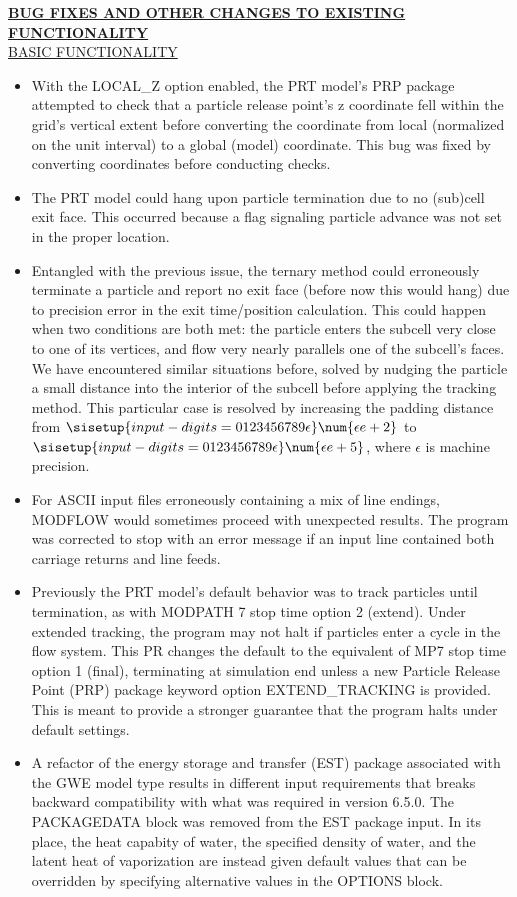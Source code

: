 	\textbf{\underline{BUG FIXES AND OTHER CHANGES TO EXISTING FUNCTIONALITY}} \\
	\underline{BASIC FUNCTIONALITY}
	\begin{itemize}
		\item With the LOCAL\_Z option enabled, the PRT model's PRP package attempted to check that a particle release point's z coordinate fell within the grid's vertical extent before converting the coordinate from local (normalized on the unit interval) to a global (model) coordinate. This bug was fixed by converting coordinates before conducting checks.
		\item The PRT model could hang upon particle termination due to no (sub)cell exit face. This occurred because a flag signaling particle advance was not set in the proper location.
		\item Entangled with the previous issue, the ternary method could erroneously terminate a particle and report no exit face (before now this would hang) due to precision error in the exit time/position calculation. This could happen when two conditions are both met: the particle enters the subcell very close to one of its vertices, and flow very nearly parallels one of the subcell's faces. We have encountered similar situations before, solved by nudging the particle a small distance into the interior of the subcell before applying the tracking method. This particular case is resolved by increasing the padding distance from $\sisetup{input-digits = 0123456789\epsilon} \num{\epsilon e+2}$ to $\sisetup{input-digits = 0123456789\epsilon} \num{\epsilon e+5}$, where $\epsilon$ is machine precision.
		\item For ASCII input files erroneously containing a mix of line endings, MODFLOW would sometimes proceed with unexpected results. The program was corrected to stop with an error message if an input line contained both carriage returns and line feeds.
		\item Previously the PRT model's default behavior was to track particles until termination, as with MODPATH 7 stop time option 2 (extend). Under extended tracking, the program may not halt if particles enter a cycle in the flow system. This PR changes the default to the equivalent of MP7 stop time option 1 (final), terminating at simulation end unless a new Particle Release Point (PRP) package keyword option EXTEND\_TRACKING is provided. This is meant to provide a stronger guarantee that the program halts under default settings.
		\item A refactor of the energy storage and transfer (EST) package associated with the GWE model type results in different input requirements that breaks backward compatibility with what was required in version 6.5.0.  The PACKAGEDATA block was removed from the EST package input.  In its place, the heat capabity of water, the specified density of water, and the latent heat of vaporization are instead given default values that can be overridden by specifying alternative values in the OPTIONS block.

\end{itemize}
